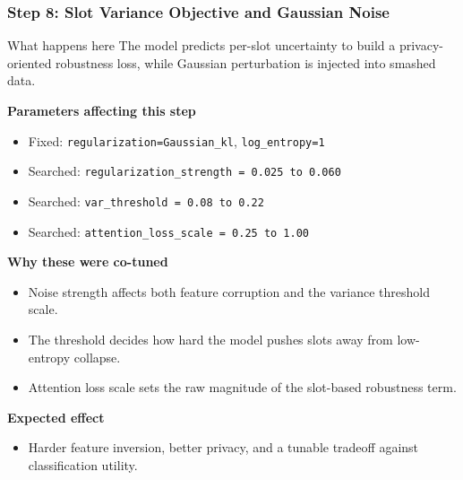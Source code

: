 \documentclass[aspectratio=169]{beamer}
\newcommand{\stepheader}[2]{
    \frametitle{Step #1: #2}
}
\begin{document}
\begin{frame}
    \stepheader{8}{Slot Variance Objective and Gaussian Noise}
    \scriptsize
    \begin{block}{What happens here}
        The model predicts per-slot uncertainty to build a privacy-oriented robustness loss, while Gaussian perturbation is injected into smashed data.
    \end{block}
    \textbf{Parameters affecting this step}
    \begin{itemize}
        \item Fixed: \texttt{regularization=Gaussian\_kl}, \texttt{log\_entropy=1}
        \item Searched: \texttt{regularization\_strength = 0.025 to 0.060}
        \item Searched: \texttt{var\_threshold = 0.08 to 0.22}
        \item Searched: \texttt{attention\_loss\_scale = 0.25 to 1.00}
    \end{itemize}
    \textbf{Why these were co-tuned}
    \begin{itemize}
        \item Noise strength affects both feature corruption and the variance threshold scale.
        \item The threshold decides how hard the model pushes slots away from low-entropy collapse.
        \item Attention loss scale sets the raw magnitude of the slot-based robustness term.
    \end{itemize}
    \textbf{Expected effect}
    \begin{itemize}
        \item Harder feature inversion, better privacy, and a tunable tradeoff against classification utility.
    \end{itemize}
\end{frame}
\end{document}
